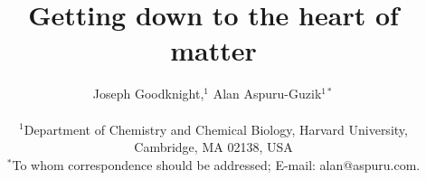 



\title{Getting down to the heart of matter}

\author
{Joseph Goodknight,$^{1}$ Alan Aspuru-Guzik$^{1\ast}$\\
\\
\normalsize{$^{1}$Department of Chemistry and Chemical Biology, Harvard University,}\\
\normalsize{Cambridge, MA 02138, USA}\\
\normalsize{$^\ast$To whom correspondence should be addressed; E-mail:  alan@aspuru.com.}
}


\date{}

\maketitle


\begin{sciabstract}
  
\end{sciabstract}











